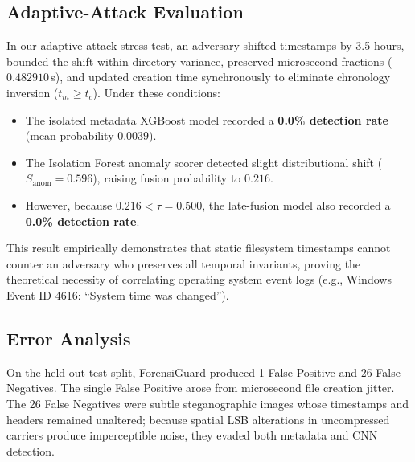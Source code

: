\documentclass[conference]{IEEEtran}
\begin{document}
\subsection{Adaptive-Attack Evaluation}
In our adaptive attack stress test, an adversary shifted timestamps by 3.5 hours, bounded the shift within directory variance, preserved microsecond fractions ($0.482910$\,s), and updated creation time synchronously to eliminate chronology inversion ($t_m \ge t_c$).
Under these conditions:
\begin{itemize}
    \item The isolated metadata XGBoost model recorded a \textbf{0.0\% detection rate} (mean probability $0.0039$).
    \item The Isolation Forest anomaly scorer detected slight distributional shift ($S_{\text{anom}} = 0.596$), raising fusion probability to $0.216$.
    \item However, because $0.216 < \tau = 0.500$, the late-fusion model also recorded a \textbf{0.0\% detection rate}.
\end{itemize}
This result empirically demonstrates that static filesystem timestamps cannot counter an adversary who preserves all temporal invariants, proving the theoretical necessity of correlating operating system event logs (e.g., Windows Event ID 4616: ``System time was changed'').

\subsection{Error Analysis}
On the held-out test split, ForensiGuard produced 1 False Positive and 26 False Negatives. The single False Positive arose from microsecond file creation jitter. The 26 False Negatives were subtle steganographic images whose timestamps and headers remained unaltered; because spatial LSB alterations in uncompressed carriers produce imperceptible noise, they evaded both metadata and CNN detection.
\end{document}
